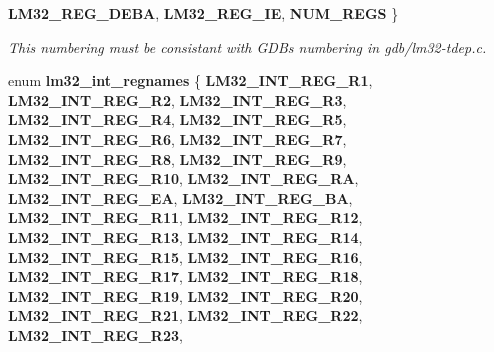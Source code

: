 \begin{DoxyCompactItemize}
{\bfseries L\+M32\+\_\+\+R\+E\+G\+\_\+\+D\+E\+BA}, 
\newline
{\bfseries L\+M32\+\_\+\+R\+E\+G\+\_\+\+IE}, 
{\bfseries N\+U\+M\+\_\+\+R\+E\+GS}
 \}
\begin{DoxyCompactList}\small\item\em This numbering must be consistant with G\+D\+Bs numbering in gdb/lm32-\/tdep.\+c. \end{DoxyCompactList}\item 
\mbox{\label{group__lm32__gdb_ga0d9572acdd6d213058fd3dd9dec23172}} 
enum {\bfseries lm32\+\_\+int\+\_\+regnames} \{ \newline
{\bfseries L\+M32\+\_\+\+I\+N\+T\+\_\+\+R\+E\+G\+\_\+\+R1}, 
{\bfseries L\+M32\+\_\+\+I\+N\+T\+\_\+\+R\+E\+G\+\_\+\+R2}, 
{\bfseries L\+M32\+\_\+\+I\+N\+T\+\_\+\+R\+E\+G\+\_\+\+R3}, 
{\bfseries L\+M32\+\_\+\+I\+N\+T\+\_\+\+R\+E\+G\+\_\+\+R4}, 
\newline
{\bfseries L\+M32\+\_\+\+I\+N\+T\+\_\+\+R\+E\+G\+\_\+\+R5}, 
{\bfseries L\+M32\+\_\+\+I\+N\+T\+\_\+\+R\+E\+G\+\_\+\+R6}, 
{\bfseries L\+M32\+\_\+\+I\+N\+T\+\_\+\+R\+E\+G\+\_\+\+R7}, 
{\bfseries L\+M32\+\_\+\+I\+N\+T\+\_\+\+R\+E\+G\+\_\+\+R8}, 
\newline
{\bfseries L\+M32\+\_\+\+I\+N\+T\+\_\+\+R\+E\+G\+\_\+\+R9}, 
{\bfseries L\+M32\+\_\+\+I\+N\+T\+\_\+\+R\+E\+G\+\_\+\+R10}, 
{\bfseries L\+M32\+\_\+\+I\+N\+T\+\_\+\+R\+E\+G\+\_\+\+RA}, 
{\bfseries L\+M32\+\_\+\+I\+N\+T\+\_\+\+R\+E\+G\+\_\+\+EA}, 
\newline
{\bfseries L\+M32\+\_\+\+I\+N\+T\+\_\+\+R\+E\+G\+\_\+\+BA}, 
{\bfseries L\+M32\+\_\+\+I\+N\+T\+\_\+\+R\+E\+G\+\_\+\+R11}, 
{\bfseries L\+M32\+\_\+\+I\+N\+T\+\_\+\+R\+E\+G\+\_\+\+R12}, 
{\bfseries L\+M32\+\_\+\+I\+N\+T\+\_\+\+R\+E\+G\+\_\+\+R13}, 
\newline
{\bfseries L\+M32\+\_\+\+I\+N\+T\+\_\+\+R\+E\+G\+\_\+\+R14}, 
{\bfseries L\+M32\+\_\+\+I\+N\+T\+\_\+\+R\+E\+G\+\_\+\+R15}, 
{\bfseries L\+M32\+\_\+\+I\+N\+T\+\_\+\+R\+E\+G\+\_\+\+R16}, 
{\bfseries L\+M32\+\_\+\+I\+N\+T\+\_\+\+R\+E\+G\+\_\+\+R17}, 
\newline
{\bfseries L\+M32\+\_\+\+I\+N\+T\+\_\+\+R\+E\+G\+\_\+\+R18}, 
{\bfseries L\+M32\+\_\+\+I\+N\+T\+\_\+\+R\+E\+G\+\_\+\+R19}, 
{\bfseries L\+M32\+\_\+\+I\+N\+T\+\_\+\+R\+E\+G\+\_\+\+R20}, 
{\bfseries L\+M32\+\_\+\+I\+N\+T\+\_\+\+R\+E\+G\+\_\+\+R21}, 
\newline
{\bfseries L\+M32\+\_\+\+I\+N\+T\+\_\+\+R\+E\+G\+\_\+\+R22}, 
{\bfseries L\+M32\+\_\+\+I\+N\+T\+\_\+\+R\+E\+G\+\_\+\+R23}, 

\end{DoxyCompactItemize}
